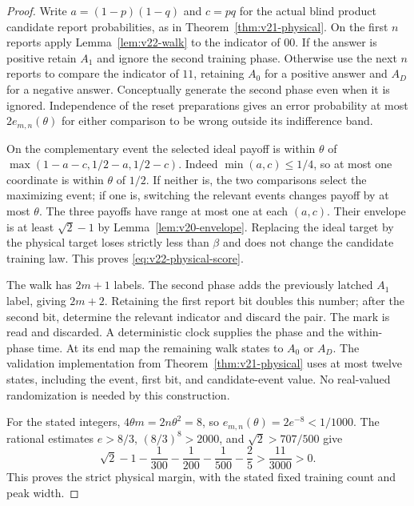 \begin{proof}
Write $a=(1-p)(1-q)$ and $c=pq$ for the actual blind product candidate
report probabilities, as in Theorem~\ref{thm:v21-physical}. On the
first $n$ reports apply Lemma~\ref{lem:v22-walk} to the indicator of
$00$. If the answer is positive retain $A_1$ and ignore the second
training phase. Otherwise use the next $n$ reports to compare the
indicator of $11$, retaining $A_0$ for a positive answer and $A_D$
for a negative answer. Conceptually generate the second phase even
when it is ignored. Independence of the reset preparations gives an
error probability at most $2e_{m,n}(\theta)$ for either comparison to
be wrong outside its indifference band.

On the complementary event the selected ideal payoff is within
$\theta$ of
$\max(1-a-c,1/2-a,1/2-c)$. Indeed $\min(a,c)\le1/4$, so at most one
coordinate is within $\theta$ of $1/2$. If neither is, the two
comparisons select the maximizing event; if one is, switching the
relevant events changes payoff by at most $\theta$. The three payoffs
have range at most one at each $(a,c)$. Their envelope is at least
$\sqrt2-1$ by Lemma~\ref{lem:v20-envelope}. Replacing the ideal target
by the physical target loses strictly less than $\beta$ and does not
change the candidate training law. This proves
\eqref{eq:v22-physical-score}.

The walk has $2m+1$ labels. The second phase adds the previously latched
$A_1$ label, giving $2m+2$. Retaining the first report bit doubles this
number; after the second bit, determine the relevant indicator and
discard the pair. The mark is read and discarded. A deterministic
clock supplies the phase and the within-phase time. At its end map the
remaining walk states to $A_0$ or $A_D$. The validation implementation
from Theorem~\ref{thm:v21-physical} uses at most twelve states, including
the event, first bit, and candidate-event value. No real-valued
randomization is needed by this construction.

For the stated integers, $4\theta m=2n\theta^2=8$, so
$e_{m,n}(\theta)=2e^{-8}<1/1000$. The rational estimates
$e>8/3$, $(8/3)^8>2000$, and $\sqrt2>707/500$ give
\[
 \sqrt2-1-\frac1{300}-\frac1{200}-\frac1{500}-\frac25
 >\frac{11}{3000}>0.
\]
This proves the strict physical margin, with the stated fixed training
count and peak width.
\end{proof}

